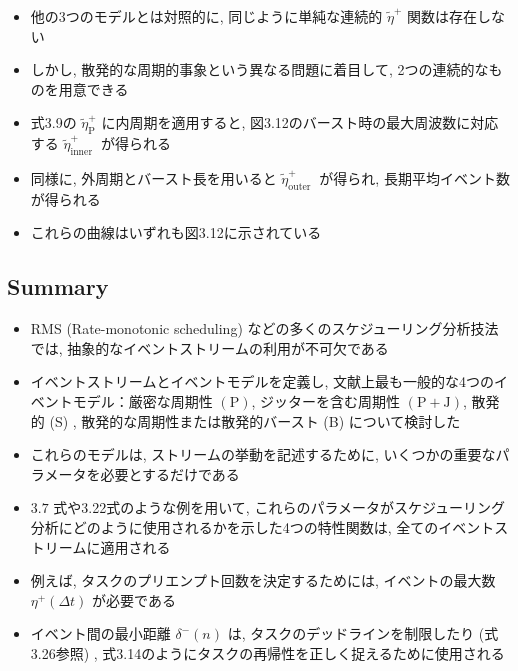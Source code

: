 \begin{frame}{}
    \begin{itemize}
        \item 他の3つのモデルとは対照的に, 同じように単純な連続的 $\tilde{\eta}^{+}$ 関数は存在しない
        \item しかし, 散発的な周期的事象という異なる問題に着目して, 2つの連続的なものを用意できる
        \item 式3.9の $\tilde{\eta}_{\mathrm{P}}^{+}$ に内周期を適用すると, 図3.12のバースト時の最大周波数に対応する $\tilde{\eta}_{\text {inner }}^{+}$ が得られる
        \item 同様に, 外周期とバースト長を用いると $\tilde{\eta}_{\text {outer }}^{+}$ が得られ, 長期平均イベント数が得られる
        \item これらの曲線はいずれも図3.12に示されている
    \end{itemize}
\end{frame}


\subsection{Summary}
\label{ssec: summary}

\begin{frame}{}
    \begin{itemize}
        \item RMS (Rate-monotonic scheduling) などの多くのスケジューリング分析技法では, 抽象的なイベントストリームの利用が不可欠である
        \item イベントストリームとイベントモデルを定義し, 文献上最も一般的な4つのイベントモデル：厳密な周期性 $(\mathrm{P})$, ジッターを含む周期性 $(\mathrm{P}+\mathrm{J})$, 散発的 (S) , 散発的な周期性または散発的バースト (B) について検討した
        \item これらのモデルは, ストリームの挙動を記述するために, いくつかの重要なパラメータを必要とするだけである
    \end{itemize}
\end{frame}

\begin{frame}{}
    \begin{itemize}
        \item $3.7$ 式や3.22式のような例を用いて, これらのパラメータがスケジューリング分析にどのように使用されるかを示した4つの特性関数は, 全てのイベントストリームに適用される
        \item 例えば, タスクのプリエンプト回数を決定するためには, イベントの最大数 $\eta^{+}(\Delta t)$ が必要である
        \item イベント間の最小距離 $\delta^{-}(n)$ は, タスクのデッドラインを制限したり (式3.26参照) , 式3.14のようにタスクの再帰性を正しく捉えるために使用される
    \end{itemize}
\end{frame}

